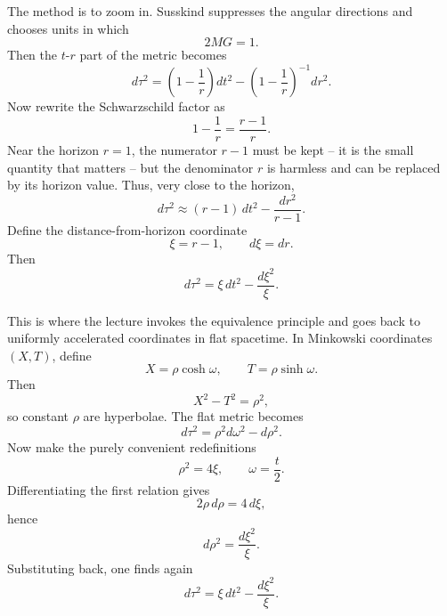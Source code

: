 The method is to zoom in. Susskind suppresses the angular directions and chooses units in which
\begin{equation}
2MG=1.
\end{equation}
Then the \(t\)-\(r\) part of the metric becomes
\begin{equation}
d\tau^{2}
=
\left(1-\frac{1}{r}\right)dt^{2}
-
\left(1-\frac{1}{r}\right)^{-1}dr^{2}.
\end{equation}
Now rewrite the Schwarzschild factor as
\begin{equation}
1-\frac{1}{r}=\frac{r-1}{r}.
\end{equation}
Near the horizon \(r=1\), the numerator \(r-1\) must be kept -- it is the small quantity that matters -- but the denominator \(r\) is harmless and can be replaced by its horizon value. Thus, very close to the horizon,
\begin{equation}
d\tau^{2}
\approx
(r-1)\,dt^{2}
-
\frac{dr^{2}}{r-1}.
\end{equation}
Define the distance-from-horizon coordinate
\begin{equation}
\xi=r-1,
\qquad
d\xi=dr.
\end{equation}
Then
\begin{equation}
d\tau^{2}
=
\xi\,dt^{2}
-
\frac{d\xi^{2}}{\xi}.
\end{equation}

This is where the lecture invokes the equivalence principle and goes back to uniformly accelerated coordinates in flat spacetime. In Minkowski coordinates \((X,T)\), define
\begin{equation}
X=\rho\cosh\omega,
\qquad
T=\rho\sinh\omega.
\end{equation}
Then
\begin{equation}
X^{2}-T^{2}=\rho^{2},
\end{equation}
so constant \(\rho\) are hyperbolae. The flat metric becomes
\begin{equation}
d\tau^{2}
=
\rho^{2}d\omega^{2}-d\rho^{2}.
\end{equation}
Now make the purely convenient redefinitions
\begin{equation}
\rho^{2}=4\xi,
\qquad
\omega=\frac{t}{2}.
\end{equation}
Differentiating the first relation gives
\begin{equation}
2\rho\,d\rho=4\,d\xi,
\end{equation}
hence
\begin{equation}
d\rho^{2}=\frac{d\xi^{2}}{\xi}.
\end{equation}
Substituting back, one finds again
\begin{equation}
d\tau^{2}
=
\xi\,dt^{2}
-
\frac{d\xi^{2}}{\xi}.
\end{equation}

